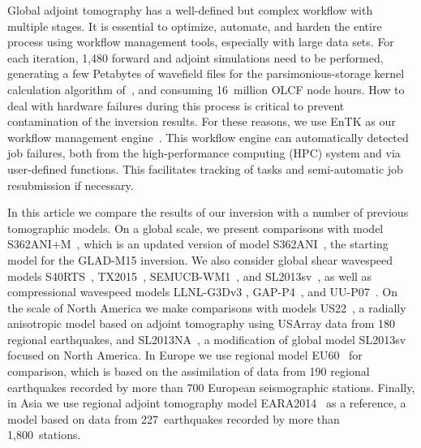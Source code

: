 Global adjoint tomography has a well-defined but complex workflow with multiple stages.
It is essential to optimize, automate, and harden the entire process using workflow management tools, especially with large data sets.
For each iteration,
1,480 forward and adjoint simulations need to be performed,
generating a few Petabytes of wavefield files for the parsimonious-storage kernel calculation algorithm of~\cite{KoXiBoPeSaLiTr16}, and consuming 16~million OLCF node hours.
How to deal with hardware failures during this process is critical
to prevent contamination of the inversion results.
For these reasons, we use EnTK as our
workflow management engine~\cite{EnTK2017}.
This workflow engine can automatically detected job failures,
both from the high-performance computing (HPC) system and via user-defined functions.
This facilitates tracking of tasks and semi-automatic job resubmission if necessary.

In this article we compare the results of our inversion with a number of previous tomographic models.
On a global scale, we present comparisons with model S362ANI$+$M~\cite{moulik2014anisotropic},
which is an updated version of model S362ANI~\cite{kustowski2008anisotropic},
the starting model for the GLAD-M15 inversion.
We also consider global shear wavespeed models S40RTS~\cite{ritsema2011s40rts},
TX2015~\cite{TX2015}, SEMUCB-WM1~\cite{french2015broad},
and SL2013sv~\cite{SchaefferLebedev13},
as well as compressional wavespeed models LLNL-G3Dv3 \cite{simmons2012llnl}, GAP-P4~\cite{fukao2013subducted}, and UU-P07~\cite{van2018atlas}.
On the scale of North America
we make comparisons with models US22~\cite{zhu2017radial},
a radially anisotropic model based on adjoint tomography using USArray data from 180 regional earthquakes,
and SL2013NA~\cite{schaeffer2014imaging},
a modification of global model SL2013sv focused on North America.
In Europe we use regional model EU60~\cite{zhu2015seismic} for comparison,
which is based on the assimilation of data from 190 regional earthquakes recorded by more than 700 European seismographic stations.
Finally, in Asia we use regional adjoint tomography model EARA2014~\cite{chen2015multiparameter} as a reference, a model based on data from 227~earthquakes recorded by more than 1,800~stations.

